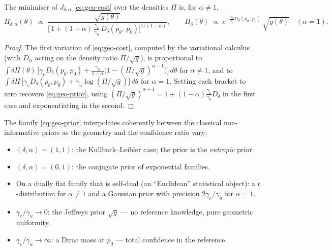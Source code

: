 \begin{proposition}
\label{prop:snoussi-prior}
The minimiser of $J_{\delta,\alpha}$ \eqref{eq:geo-cost} over the densities
$\Pi$ is, for $\alpha \neq 1$,
\begin{equation}
\Pi_{\delta,\alpha}(\theta) \;\propto\;
\frac{\sqrt{g(\theta)}}
{\bigl[\,1 + (1-\alpha)\,\tfrac{\gamma_e}{\gamma_u}
\,D_\delta(p_\theta,\, p_0)\bigr]^{1/(1-\alpha)}},
\qquad
\Pi_{\delta}(\theta) \;\propto\;
e^{-\frac{\gamma_e}{\gamma_u} D_\delta(p_\theta,\,p_0)}\,\sqrt{g(\theta)}
\quad(\alpha = 1).
\label{eq:geo-prior}
\end{equation}
\end{proposition}

\begin{proof}
The first variation of \eqref{eq:geo-cost}, computed by the variational
calculus (with $D_\alpha$ acting on the density ratio $\Pi/\sqrt{g}$), is
proportional to
$\int \delta\Pi(\theta)\,\bigl[\gamma_e D_\delta(p_\theta,p_0)
+ \tfrac{\gamma_u}{1-\alpha}\bigl(1-(\Pi/\sqrt{g})^{\alpha-1}\bigr)\bigr]
\,d\theta$ for $\alpha \neq 1$, and to
$\int \delta\Pi\,\bigl[\gamma_e D_\delta(p_\theta,p_0)
+ \gamma_u \log(\Pi/\sqrt{g})\bigr]\,d\theta$ for $\alpha = 1$.
Setting each bracket to zero recovers \eqref{eq:geo-prior}, using
$(\Pi/\sqrt{g})^{\alpha-1}
= 1 + (1-\alpha)\tfrac{\gamma_e}{\gamma_u}D_\delta$ in the first case and
exponentiating in the second.
\end{proof}

The family \eqref{eq:geo-prior} interpolates coherently between the classical
non-informative priors as the geometry and the confidence ratio vary:
\begin{itemize}
    \item $(\delta,\alpha) = (1,1)$: the Kullback--Leibler case; the prior is
          the \emph{entropic} prior.
    \item $(\delta,\alpha) = (0,1)$: the conjugate prior of exponential
          families.
    \item On a dually flat family that is self-dual (an ``Euclidean'' statistical
          object): a $t$-distribution for $\alpha \neq 1$ and a Gaussian prior
          with precision $2\gamma_e/\gamma_u$ for $\alpha = 1$.
    \item $\gamma_e/\gamma_u \to 0$: the Jeffreys prior $\sqrt{g}$ --- no
          reference knowledge, pure geometric uniformity.
    \item $\gamma_e/\gamma_u \to \infty$: a Dirac mass at $p_0$ --- total
          confidence in the reference.
\end{itemize}

